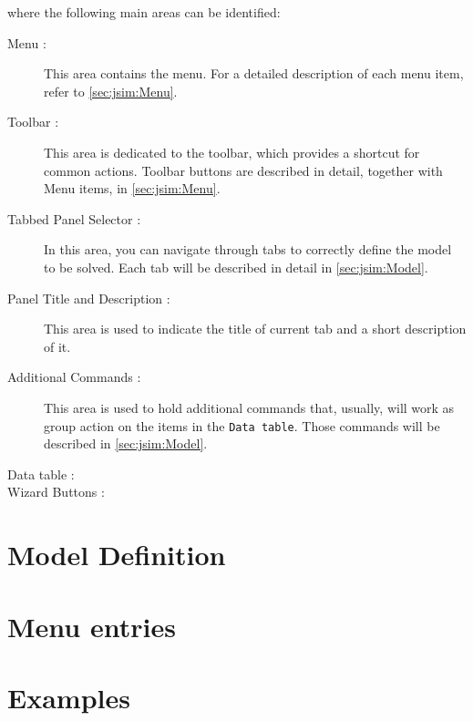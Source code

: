 where the following main areas can be identified:
\begin{description}
	\item[Menu :] This area contains the menu. For a detailed description of each menu item, refer to \autoref{sec:jsim:Menu}.
	\item[Toolbar :] This area is dedicated to the toolbar, which provides a shortcut for common actions. Toolbar buttons are described in detail, together with Menu items, in \autoref{sec:jsim:Menu}.
	\item[Tabbed Panel Selector :] In this area, you can navigate through tabs to correctly define the model to be solved. Each tab will be described in detail in \autoref{sec:jsim:Model}.
	\item[Panel Title and Description :] This area is used to indicate the title of current tab and a short description of it.
	\item[Additional Commands :] This area is used to hold additional commands that, usually, will work as group action on the items in the \texttt{Data table}. Those commands will be described in \autoref{sec:jsim:Model}.
	\item[Data table :]
	\item[Wizard Buttons :]
\end{description}

\section{Model Definition}
\label{sec:jsim:Model}


\section{Menu entries}
\label{sec:jsim:Menu}

\section{Examples}
\label{sec:jsim:Examples}
